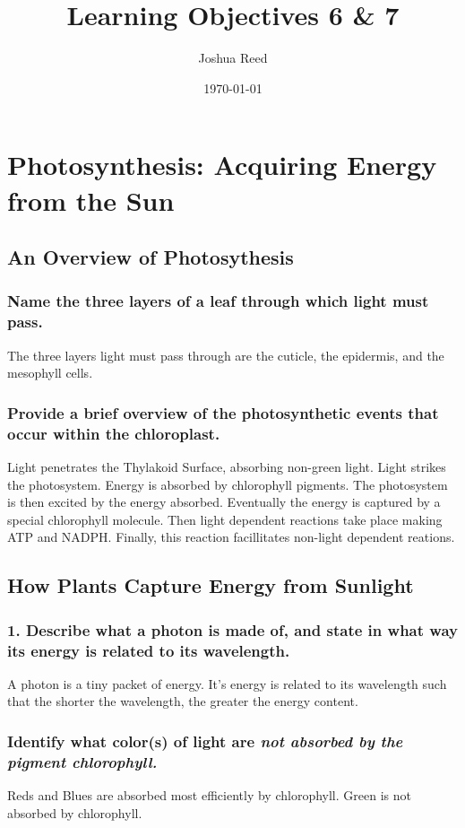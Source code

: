 \documentclass[a4paper]{article}
\title{Learning Objectives 6 \& 7}
\author{Joshua Reed}
\date{\today}
\begin{document}
\maketitle

\section{Photosynthesis: Acquiring Energy from the Sun}
\subsection{An Overview of Photosythesis}
\subsubsection{Name the three layers of a leaf through which light must pass.}
The three layers light must pass through are the cuticle, the epidermis, and the mesophyll
cells.

\subsubsection{Provide a brief overview of the photosynthetic events that occur within the
chloroplast.} 
Light penetrates the Thylakoid Surface, absorbing non-green light. Light strikes the photosystem.
Energy is absorbed by chlorophyll pigments. The photosystem is then excited by the energy 
absorbed. Eventually the energy is captured by a special chlorophyll molecule. Then light 
dependent reactions take place making ATP and NADPH. Finally, this reaction facillitates 
non-light dependent reations.

\subsection{How Plants Capture Energy from Sunlight}
\subsubsection{1. Describe what a photon is made of, and state in what way its 
energy is related to its wavelength.}
A photon is a tiny packet of energy. It's energy is related to its wavelength such that
the shorter the wavelength, the greater the energy content.


\subsubsection{Identify what color(s) of light are \it{not} absorbed by the pigment
chlorophyll.}
Reds and Blues are absorbed most efficiently by chlorophyll. Green is not absorbed by
chlorophyll.
\end{document}
